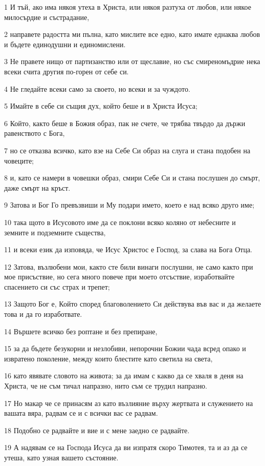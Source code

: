 \par 1 И тъй, ако има някоя утеха в Христа, или някоя разтуха от любов, или някое милосърдие и състрадание,
\par 2 направете радостта ми пълна, като мислите все едно, като имате еднаква любов и бъдете единодушни и единомислени.
\par 3 Не правете нищо от партизанство или от щеславие, но със смиреномъдрие нека всеки счита другия по-горен от себе си.
\par 4 Не гледайте всеки само за своето, но всеки и за чуждото.
\par 5 Имайте в себе си същия дух, който беше и в Христа Исуса;
\par 6 Който, както беше в Божия образ, пак не счете, че трябва твърдо да държи равенството с Бога,
\par 7 но се отказва всичко, като взе на Себе Си образ на слуга и стана подобен на човеците;
\par 8 и, като се намери в човешки образ, смири Себе Си и стана послушен до смърт, даже смърт на кръст.
\par 9 Затова и Бог Го превъзвиши и Му подари името, което е над всяко друго име;
\par 10 така щото в Исусовото име да се поклони всяко коляно от небесните и земните и подземните същества,
\par 11 и всеки език да изповяда, че Исус Христос е Господ, за слава на Бога Отца.
\par 12 Затова, възлюбени мои, както сте били винаги послушни, не само както при мое присъствие, но сега много повече при моето отсъствие, изработвайте спасението си със страх и трепет;
\par 13 Защото Бог е, Който според благоволението Си действува във вас и да желаете това и да го изработвате.
\par 14 Вършете всичко без роптане и без препиране,
\par 15 за да бъдете безукорни и незлобиви, непорочни Божии чада всред опако и извратено поколение, между които блестите като светила на света,
\par 16 като явявате словото на живота; за да имам с какво да се хваля в деня на Христа, че не съм тичал напразно, нито съм се трудил напразно.
\par 17 Но макар че се принасям аз като възлияние върху жертвата и служението на вашата вяра, радвам се и с всички вас се радвам.
\par 18 Подобно се радвайте и вие и с мене заедно се радвайте.
\par 19 А надявам се на Господа Исуса да ви изпратя скоро Тимотея, та и аз да се утеша, като узная вашето състояние.
